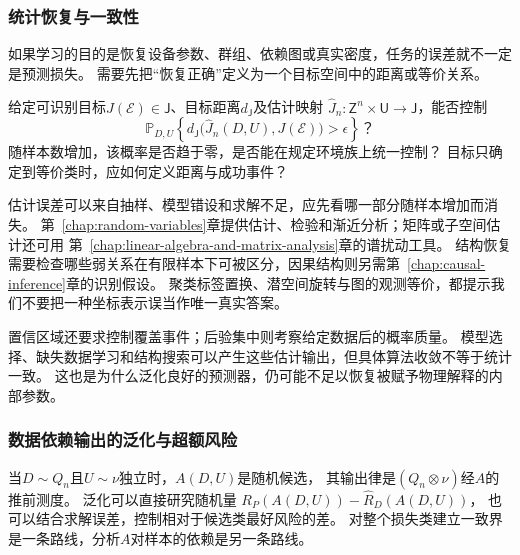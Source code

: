 \subsubsection{统计恢复与一致性}
\label{sec:future-analysis-statistical-recovery}

如果学习的目的是恢复设备参数、群组、依赖图或真实密度，任务的误差就不一定是预测损失。
需要先把“恢复正确”定义为一个目标空间中的距离或等价关系。

\begin{mathproblem}[估计映射的恢复误差与统计一致性]
  \label{question:future-statistical-recovery}
  给定可识别目标$J(\mathcal E)\in\mathsf J$、目标距离$d_{\mathsf J}$及估计映射
  $\widehat J_n:\mathsf Z^n\times\mathsf U\to\mathsf J$，能否控制
  \[
    \mathbb P_{D,U}\!\left\{
      d_{\mathsf J}\bigl(\widehat J_n(D,U),J(\mathcal E)\bigr)>\epsilon
    \right\}\text{？}
  \]
  随样本数增加，该概率是否趋于零，是否能在规定环境族上统一控制？
  目标只确定到等价类时，应如何定义距离与成功事件？
\end{mathproblem}

估计误差可以来自抽样、模型错设和求解不足，应先看哪一部分随样本增加而消失。
第~\ref{chap:random-variables}章提供估计、检验和渐近分析；矩阵或子空间估计还可用
第~\ref{chap:linear-algebra-and-matrix-analysis}章的谱扰动工具。
结构恢复需要检查哪些弱关系在有限样本下可被区分，因果结构则另需第~\ref{chap:causal-inference}章的识别假设。
聚类标签置换、潜空间旋转与图的观测等价，都提示我们不要把一种坐标表示误当作唯一真实答案。

置信区域还要求控制覆盖事件；后验集中则考察给定数据后的概率质量。
模型选择、缺失数据学习和结构搜索可以产生这些估计输出，但具体算法收敛不等于统计一致。
这也是为什么泛化良好的预测器，仍可能不足以恢复被赋予物理解释的内部参数。

\subsubsection{数据依赖输出的泛化与超额风险}
\label{sec:future-analysis-learned-risk}

当$D\sim Q_n$且$U\sim\nu$独立时，$A(D,U)$是随机候选，
其输出律是$(Q_n\otimes\nu)$经$A$的推前测度。
泛化可以直接研究随机量
$R_P(A(D,U))-\widehat R_D(A(D,U))$，
也可以结合求解误差，控制相对于候选类最好风险的差。
对整个损失类建立一致界是一条路线，分析$A$对样本的依赖是另一条路线。

